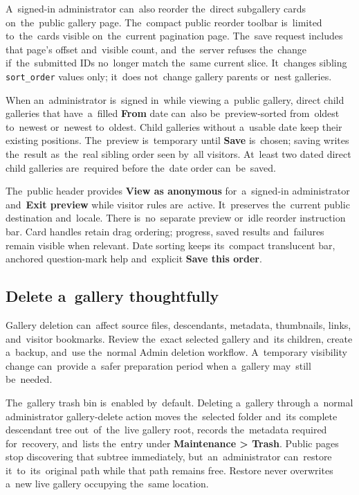 \documentclass[11pt,a4paper]{article}
\newcommand{\ui}[1]{\textbf{#1}}
\newcommand{\codeword}[1]{\nolinkurl{#1}}
\begin{document}
A~signed-in administrator can~also reorder the~direct subgallery cards
on~the~public gallery page. The~compact public reorder toolbar is~limited
to~the~cards visible on~the~current pagination page. The~save request includes
that page's offset and~visible count, and~the~server refuses the~change
if~the~submitted IDs no~longer match the~same current slice. It~changes sibling
\codeword{sort_order} values only; it~does not~change gallery parents or~nest
galleries.

When an~administrator is~signed in~while viewing a~public gallery, direct child
galleries that have~a~filled \ui{From} date can~also be~preview-sorted
from~oldest to~newest or~newest to~oldest. Child galleries without a~usable date
keep their existing positions. The~preview is~temporary until \ui{Save}
is~chosen; saving writes the~result as~the~real sibling order seen by~all
visitors. At~least two dated direct child galleries are~required before the~date
order can~be~saved.

The~public header provides \ui{View as anonymous} for~a~signed-in administrator
and~\ui{Exit preview} while visitor rules are~active. It~preserves the~current
public destination and~locale. There is~no~separate preview or~idle reorder
instruction bar. Card handles retain drag ordering; progress, saved results
and~failures remain visible when relevant. Date sorting keeps its~compact
translucent bar, anchored question-mark help and~explicit \ui{Save this order}.

\subsection{Delete a~gallery thoughtfully}

Gallery deletion can~affect source files, descendants, metadata, thumbnails,
links, and~visitor bookmarks. Review the~exact selected gallery and~its
children, create a~backup, and~use the~normal Admin deletion workflow.
A~temporary visibility change can~provide a~safer preparation period when
a~gallery may~still be~needed.

The~gallery trash bin is~enabled by~default. Deleting a~gallery through a~normal
administrator gallery-delete action moves the~selected folder and~its complete
descendant tree out~of~the~live gallery root, records the~metadata required
for~recovery, and~lists the~entry under \ui{Maintenance > Trash}. Public pages
stop discovering that subtree immediately, but~an~administrator can~restore
it~to~its~original path while that path remains free. Restore never overwrites
a~new live gallery occupying the~same location.
\end{document}
